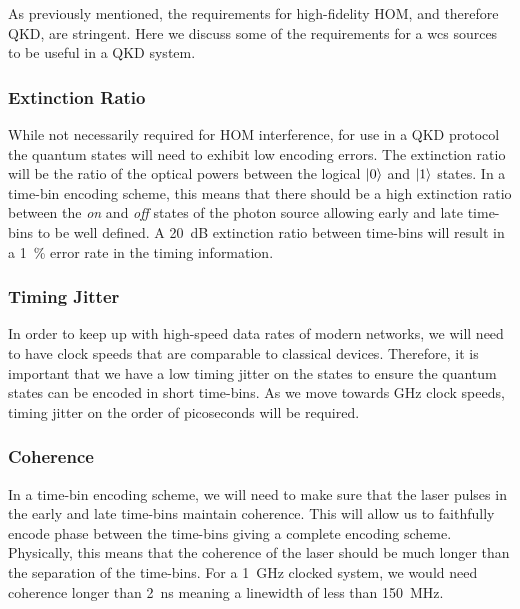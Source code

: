 As previously mentioned, the requirements for high-fidelity \ac{HOM}, and therefore \ac{QKD}, are stringent. Here we discuss some of the requirements for a \ac{wcs} sources to be useful in a \ac{QKD} system. 

\subsubsection*{Extinction Ratio}

While not necessarily required for \ac{HOM} interference, for use in a \ac{QKD} protocol the quantum states will need to exhibit low encoding errors. The extinction ratio will be the ratio of the optical powers between the logical $\ket{0}$ and $\ket{1}$ states. In a time-bin encoding scheme, this means that there should be a high extinction ratio between the \textit{on} and \textit{off} states of the photon source allowing early and late time-bins to be well defined. A \SI{20}{dB} extinction ratio between time-bins will result in a \SI{1}{\percent} error rate in the timing information.


\subsubsection*{Timing Jitter}

In order to keep up with high-speed data rates of modern networks, we will need to have clock speeds that are comparable to classical devices. Therefore, it is important that we have a low timing jitter on the states to ensure the quantum states can be encoded in short time-bins. As we move towards GHz clock speeds, timing jitter on the order of picoseconds will be required.

\subsubsection*{Coherence}

In a time-bin encoding scheme, we will need to make sure that the laser pulses in the early and late time-bins maintain coherence. This will allow us to faithfully encode phase between the time-bins giving a complete encoding scheme. Physically, this means that the coherence of the laser should be much longer than the separation of the time-bins. For a \SI{1}{GHz} clocked system, we would need coherence longer than \SI{2}{\ns} meaning a linewidth of less than \SI{150}{MHz}.

